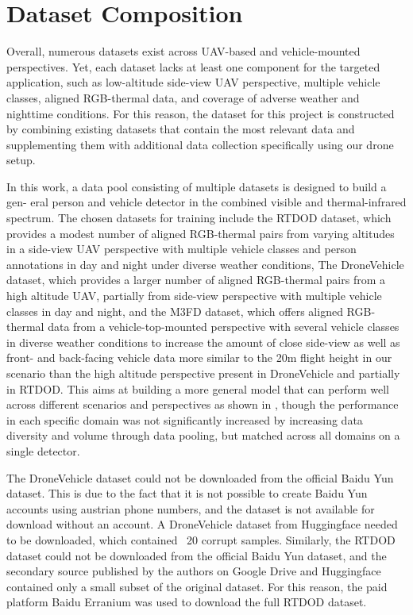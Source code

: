 \documentclass[12pt,oneside,bibtotoc,liststotoc]{scrbook}
\begin{document}
\section{Dataset Composition}

Overall, numerous datasets exist across UAV-based and
vehicle-mounted perspectives. Yet, each dataset lacks at least one
component for the targeted application, such as low-altitude
side-view UAV perspective, multiple vehicle classes, aligned
RGB-thermal data, and coverage of adverse weather and nighttime
conditions.
For this reason, the dataset for this project is constructed
by combining existing datasets that contain the most relevant data
and supplementing them with additional data collection specifically
using our drone setup.

In this work, a data pool consisting of multiple datasets is designed to build a gen-
eral person and vehicle detector in the combined visible and thermal-infrared
spectrum.
The chosen datasets for training include the RTDOD dataset, which
provides a modest number of aligned RGB-thermal pairs from varying
altitudes in a side-view UAV perspective with multiple vehicle classes
and person annotations in day and night under diverse weather conditions,
The DroneVehicle dataset,
which provides a larger number of aligned RGB-thermal pairs from a
high altitude UAV, partially from  side-view
perspective with multiple vehicle classes in day and night, and the
M3FD dataset, which offers aligned RGB-thermal data from a
vehicle-top-mounted perspective with several vehicle classes in diverse
weather conditions to increase the amount of close side-view as well
as front- and back-facing vehicle data
more similar to the 20m flight height in our scenario than the high altitude
perspective present in DroneVehicle and partially in RTDOD.
This aims at building a more general model that can perform well across different
scenarios and perspectives as shown in \cite{becker2025fusionOrConfusionDatasetPooling},
though the performance in each specific domain was not significantly increased
by increasing data diversity and volume through data pooling, but matched
across all domains on a single detector.

The DroneVehicle
dataset could not be downloaded from the official Baidu Yun dataset.
This is due to the fact that it is not possible to create Baidu Yun
accounts using austrian phone numbers, and the dataset is not available
for download without an account.
A DroneVehicle dataset from Huggingface needed to be downloaded, which
contained ~20 corrupt samples.
Similarly, the RTDOD dataset could not be downloaded from the official
Baidu Yun dataset, and the secondary source published by the authors
on Google Drive and Huggingface contained only a small subset of
the original dataset. For this reason, the paid platform Baidu
Erranium was used to download the full RTDOD dataset.
\end{document}
